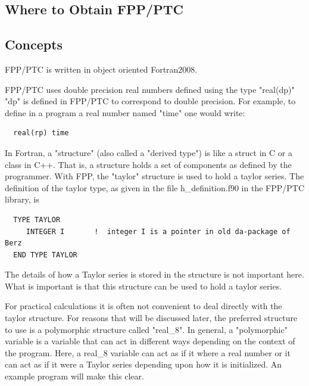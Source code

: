 \documentclass[english,12pt,article]{article} %
\begin{document}
\subsection{Where to Obtain FPP/PTC}

\subsection{Concepts}

FPP/PTC is written in object oriented Fortran2008. 

FPP/PTC uses double precision real numbers defined using the type "real(dp)" "dp" is defined in FPP/PTC to correspond to double precision. For example, to define in a program a real number named "time" one would write:
\begin{verbatim}
  real(rp) time
\end{verbatim}

In Fortran, a "structure" (also called a "derived type") is like a struct in C or a class in C++. That is, a structure holds a set of components as defined by the programmer. With FPP, the "taylor" structure is used to hold a taylor series. The definition of the taylor type, as given in the file h_definition.f90 in the FPP/PTC library, is
{\footnotesize
\begin{verbatim}
  TYPE TAYLOR
     INTEGER I       !  integer I is a pointer in old da-package of Berz
  END TYPE TAYLOR
\end{verbatim}
}
The details of how a Taylor series is stored in the structure is not important here. What is important is that this structure can be used to hold a taylor series.

For practical calculations it is often not convenient to deal directly with the taylor structure. For reasons that will be discussed later, the preferred structure to use is a polymorphic structure called "real_8". In general, a "polymorphic" variable is a variable that can act in different ways depending on the context of the program. Here, a real_8 variable can act as if it where a real number or it can act as if it were a Taylor series depending upon how it is initialized.
An example program will make this clear.
\end{document}
